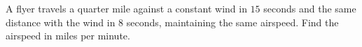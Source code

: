 A flyer travels a quarter mile against a constant wind in $15$ seconds and the same distance with the wind in $8$ seconds, maintaining the same airspeed. Find the airspeed in miles per minute.
